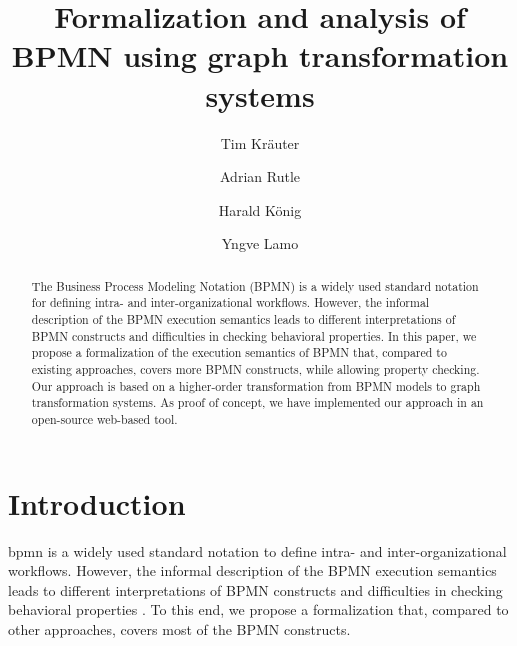 \documentclass[runningheads]{llncs}
\begin{document}
%
\title{Formalization and analysis of BPMN using graph transformation systems}
%
%
\author{Tim Kr\"{a}uter \and
Adrian Rutle \and
Harald K\"{o}nig \and
Yngve Lamo}
%
%
%
\maketitle              %
%
\begin{abstract}
The Business Process Modeling Notation (BPMN) is a widely used standard notation for defining intra- and inter-organizational workflows.
However, the informal description of the BPMN execution semantics leads to different interpretations of BPMN constructs and difficulties in checking behavioral properties.
In this paper, we propose a formalization of the execution semantics of BPMN that, compared to existing approaches, covers more BPMN constructs, while allowing property checking.
Our approach is based on a higher-order transformation from BPMN models to graph transformation systems.
As proof of concept, we have implemented our approach in an open-source web-based tool.

\end{abstract}
%
%
%
\section{Introduction}
\gls*{bpmn} \cite{objectmanagementgroupBusinessProcessModel2013} is a widely used standard notation to define intra- and inter-organizational workflows.
However, the informal description of the BPMN execution semantics leads to different interpretations of BPMN constructs and difficulties in checking behavioral properties \cite{corradiniFormalApproachAnalysis2021}.
To this end, we propose a formalization that, compared to other approaches, covers most of the BPMN constructs.
\end{document}
